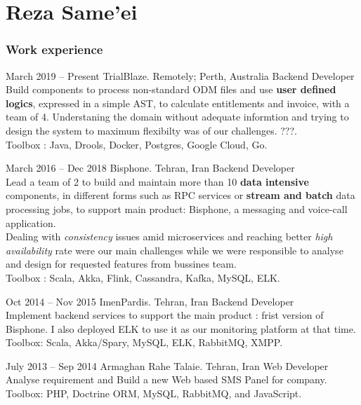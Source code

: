 \documentclass{tccv}
\begin{document}
\part{Reza Same'ei}

\section{Work experience}

\begin{eventlist}

\item{March 2019 -- Present}
  {TrialBlaze. Remotely; Perth, Australia}
  {Backend Developer}
  \\Build components to process non-standard ODM files and use \textbf{user defined logics}, expressed in a simple AST, to calculate entitlements and invoice, with a team of 4. Understaning the domain without adequate informtion and trying to design the system to maximum flexibilty was of our challenges. ???.\\Toolbox : Java, Drools, Docker, Postgres, Google Cloud, Go.

\item{March 2016 -- Dec 2018}
  {Bisphone. Tehran, Iran}
  {Backend Developer}
  \\Lead a team of 2 to build and maintain more than 10 \textbf{data intensive} components, in different forms such as RPC services or \textbf{stream and batch} data processing jobs, to support main product: Bisphone, a messaging and voice-call application.\\Dealing with \textit{consistency} issues amid microservices and reaching better \textit{high availability} rate were our main challenges while we were responsible to analyse and design for requested features from bussines team.\\Toolbox : Scala, Akka, Flink, Cassandra, Kafka, MySQL, ELK.

\item{Oct 2014 -- Nov 2015}
  {ImenPardis. Tehran, Iran}
  {Backend Developer}
  \\Implement backend services to support the main product : frist version of Bisphone. I also deployed ELK to use it as our monitoring platform at that time.\\Toolbox: Scala, Akka/Spary, MySQL, ELK, RabbitMQ, XMPP.

\item{July 2013 -- Sep 2014}
  {Armaghan Rahe Talaie. Tehran, Iran}
  {Web Developer}
  \\Analyse requirement and Build a new Web based SMS Panel for company.\\Toolbox: PHP, Doctrine ORM, MySQL, RabbitMQ, and JavaScript.


\end{eventlist}
\end{document}
